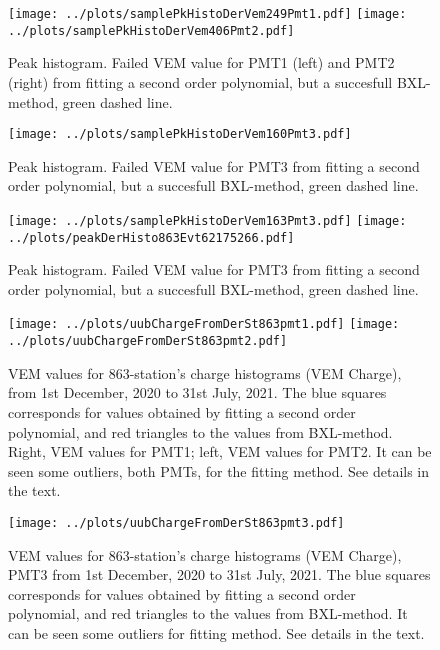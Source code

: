 \documentclass[twoside, final, 10pt]{articleMine}
\begin{document}
\begin{figure}[!tbh]
  \centering
  \subfigure
  {
    \texttt{[image: ../plots/samplePkHistoDerVem249Pmt1.pdf]}
    \texttt{[image: ../plots/samplePkHistoDerVem406Pmt2.pdf]}
  }
  \caption{Peak histogram. Failed VEM value for PMT1 (left) and
  PMT2 (right) from fitting a second order polynomial, but a
  succesfull BXL-method, green dashed line.}
  \label{figPkSampleFailFitGoodDerpmt12}
\end{figure}

\begin{figure}[!tbh]
  \centering
  \subfigure
  {
    \texttt{[image: ../plots/samplePkHistoDerVem160Pmt3.pdf]}
  }
  \caption{Peak histogram. Failed VEM value for PMT3 from fitting
  a second order polynomial, but a succesfull BXL-method, green
  dashed line.}
  \label{figPkSampleFailFitGoodDerpmt3}
\end{figure}

\begin{figure}[!tbh]
  \centering
  \subfigure
  {
    \texttt{[image: ../plots/samplePkHistoDerVem163Pmt3.pdf]}
    \texttt{[image: ../plots/peakDerHisto863Evt62175266.pdf]}
  }
  \caption{Peak histogram. Failed VEM value for PMT3 from fitting
  a second order polynomial, but a succesfull BXL-method, green
  dashed line.}
  \label{figPkSampleFailFitDerpmt3}
\end{figure}
\clearpage


\begin{figure}[!tbh]
  \centering
  \subfigure
  {
    \texttt{[image: ../plots/uubChargeFromDerSt863pmt1.pdf]}
    \texttt{[image: ../plots/uubChargeFromDerSt863pmt2.pdf]}
  }
  \caption{VEM values for 863-station's charge histograms (VEM
  Charge), from 1st December, 2020 to 31st July, 2021. The blue
  squares corresponds for values obtained by fitting a second
  order polynomial, and red triangles to the values from
  BXL-method. Right, VEM values for PMT1; left, VEM values for
  PMT2. It can be seen some outliers, both PMTs, for the fitting
  method. See details in the text.}
  \label{figChVemCompFitDerTimePmt1}
\end{figure}

\begin{figure}[!tbh]
  \centering
  \subfigure
  {
    \texttt{[image: ../plots/uubChargeFromDerSt863pmt3.pdf]}
  }
  \caption{VEM values for 863-station's charge histograms (VEM
  Charge), PMT3 from 1st December, 2020 to 31st July, 2021. The
  blue squares corresponds for values obtained by fitting a
  second order polynomial, and red triangles to the values from
  BXL-method. It can be seen some outliers for fitting method.
  See details in the text.} 
  \label{figChVemCompFitDerTimePmt3}
\end{figure}
\clearpage
\end{document}
